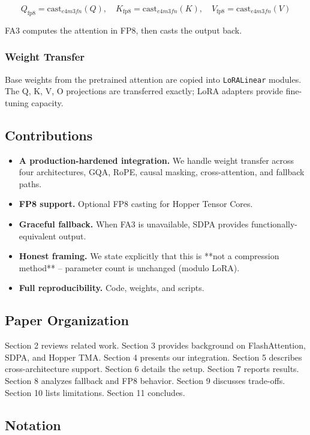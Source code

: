 \[
Q_\text{fp8} = \text{cast}_{e4m3fn}(Q), \quad
K_\text{fp8} = \text{cast}_{e4m3fn}(K), \quad
V_\text{fp8} = \text{cast}_{e4m3fn}(V)
\tag{1.2}
\]

FA3 computes the attention in FP8, then casts the output back.

\subsubsection{Weight Transfer}

Base weights from the pretrained attention are copied into \texttt{LoRALinear} 
modules. The Q, K, V, O projections are transferred exactly; LoRA adapters 
provide fine-tuning capacity.

\subsection{Contributions}

\begin{itemize}
\item \textbf{A production-hardened integration.} We handle weight transfer across
  four architectures, GQA, RoPE, causal masking, cross-attention, and
  fallback paths.
\item \textbf{FP8 support.} Optional FP8 casting for Hopper Tensor Cores.
\item \textbf{Graceful fallback.} When FA3 is unavailable, SDPA provides
  functionally-equivalent output.
\item \textbf{Honest framing.} We state explicitly that this is **not a compression
  method** -- parameter count is unchanged (modulo LoRA).
\item \textbf{Full reproducibility.} Code, weights, and scripts.

\end{itemize}
\subsection{Paper Organization}

Section 2 reviews related work. Section 3 provides background on 
FlashAttention, SDPA, and Hopper TMA. Section 4 presents our integration. 
Section 5 describes cross-architecture support. Section 6 details the setup. 
Section 7 reports results. Section 8 analyzes fallback and FP8 behavior. 
Section 9 discusses trade-offs. Section 10 lists limitations. Section 11 
concludes.



\subsection{Notation}

